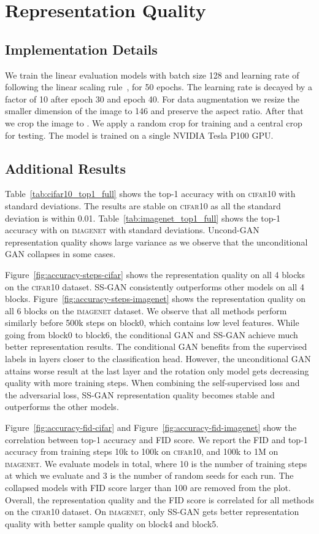 \documentclass[10pt,twocolumn,letterpaper]{article}
\newcommand{\cifar}{\textsc{cifar10}}
\newcommand{\imagenet}{\textsc{imagenet}}
\begin{document}
\section{Representation Quality}

\subsection{Implementation Details}
We  train  the  linear  evaluation models with batch size 128 and learning rate of  following the linear scaling rule~\cite{goyal2017accurate}, for 50 epochs.
The learning rate is decayed by a factor of 10 after epoch 30 and epoch 40.
For data augmentation we resize the smaller dimension of the image to 146 and preserve the aspect ratio.
After that we crop the image to .
We apply a random crop for training and a central crop for testing.
The model is trained on a single NVIDIA Tesla P100 GPU.

\subsection{Additional Results}
Table~\ref{tab:cifar10_top1_full} shows the top-1 accuracy with on \cifar{} with standard deviations.
The results are stable on \cifar{} as all the standard deviation is within 0.01.
Table~\ref{tab:imagenet_top1_full} shows the top-1 accuracy with on \imagenet{} with standard deviations.
Uncond-GAN representation quality shows large variance as we observe that the unconditional GAN collapses in some cases.


Figure~\ref{fig:accuracy-steps-cifar} shows the representation quality on all 4 blocks on the \cifar{} dataset.
SS-GAN consistently outperforms other models on all 4 blocks.
Figure~\ref{fig:accuracy-steps-imagenet} shows the representation quality on all 6 blocks on the \imagenet{} dataset.
We observe that all methods perform similarly before 500k steps on block0, which contains low level features.
While going from block0 to block6, the conditional GAN and SS-GAN achieve much better representation results.
The conditional GAN benefits from the supervised labels in layers closer to the classification head.
However, the unconditional GAN attains worse result at the last layer and the rotation only model gets decreasing quality with more training steps.
When combining the self-supervised loss and the adversarial loss, SS-GAN representation quality becomes stable and outperforms the other models.

Figure~\ref{fig:accuracy-fid-cifar} and Figure~\ref{fig:accuracy-fid-imagenet} show the correlation between top-1 accuracy and FID score.
We report the FID and top-1 accuracy from training steps 10k to 100k on \cifar{}, and 100k to 1M on \imagenet{}.
We evaluate  models in total, where 10 is the number of training steps at which we evaluate and 3 is the number of random seeds for each run.
The collapsed models with FID score larger than 100 are removed from the plot.
Overall, the representation quality and the FID score is correlated for all methods on the \cifar{} dataset.
On \imagenet{}, only SS-GAN gets better representation quality with better sample quality on block4 and block5.
\end{document}
